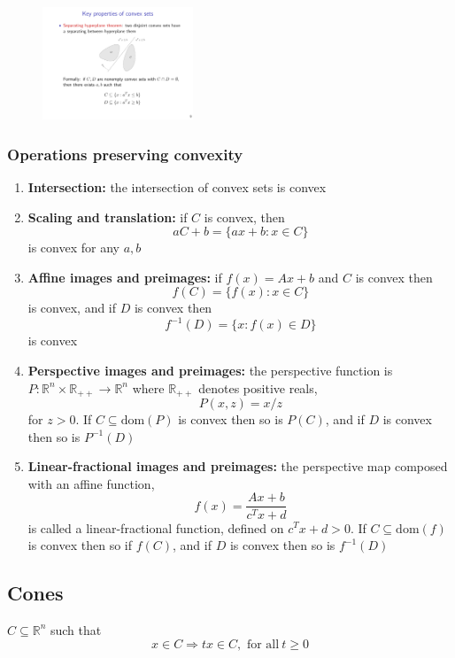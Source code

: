 \documentclass[a4paper]{article}
\begin{document}
{\begin{figure}[htbp] 
  \centering 
  \includegraphics[width=0.4\textwidth]{img/hyperplane_separating.pdf} 
\end{figure}

\subsubsection{Operations preserving convexity}
\begin{enumerate}
  \item \textbf{Intersection:} the intersection of convex sets is convex
  \item \textbf{Scaling and translation:} if $C$ is convex, then
  \[ 
    aC + b = \{ax+ b : x \in C\}
    \]
  is convex for any $a, b$
  \item \textbf{Affine images and preimages:} if $f(x) = Ax +b$ and $C$ is convex then 
  \begin{equation}
    f(C) = \{f(x) : x \in C\}
  \end{equation}
  is convex, and if $D$ is convex then 
  \begin{equation}
    f^{-1}(D) = \{x: f(x) \in D\}
  \end{equation}
  is convex
  \item \textbf{Perspective images and preimages:} the perspective function is $P : \mathbb{R}^n \times \mathbb{R}_{++} \rightarrow \mathbb{R}^n$ where $ \mathbb{R}_{++}$ denotes positive reals,
  \[ 
    P(x, z) = x / z
    \]
  for $ z > 0$. If $C \subseteq \text{dom}(P)$ is convex then so is $P(C)$, and if $D $ is convex then so is $P^{-1}(D)$
  \item  \textbf{Linear-fractional images and preimages:} the perspective map composed with an affine function,
  \[ 
    f(x) = \frac{Ax + b}{c^T x + d}
    \]
  is called a linear-fractional function, defined on $c^T x + d > 0$. If $C \subseteq \text{dom}(f)$ is convex then so if $f(C)$, and if $D$ is convex then so is $f^{-1}(D)$ 
\end{enumerate}

\subsection{Cones}
\begin{defi}[Cone]
  $C \subseteq \mathbb{R}^n$ such that  
  \[
    x \in C \Longrightarrow  tx \in C,\text{\ for\ all}\ t \geq 0 
  \]
\end{defi}

}
\end{document}
